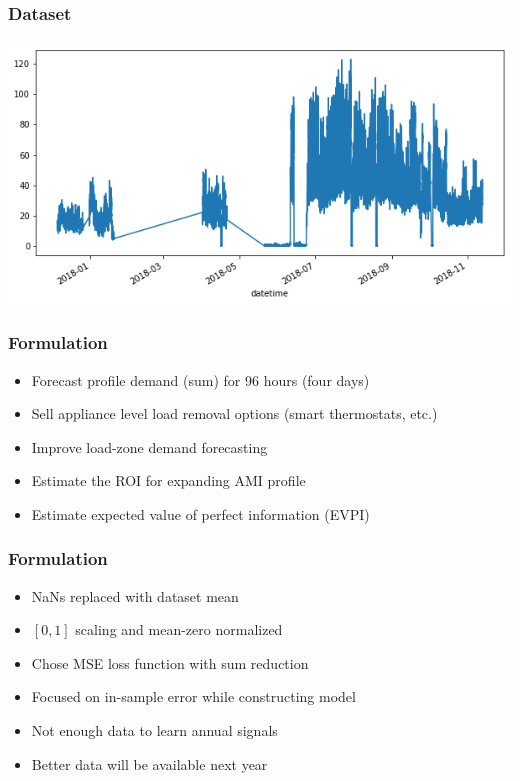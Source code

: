 \documentclass{beamer}
\begin{document}
\begin{frame}
  \frametitle{Dataset}
  \includegraphics[width=\textwidth]{datetimesum.png}
\end{frame}

\begin{frame}
  \frametitle{Formulation}
  \begin{itemize}
    \item Forecast profile demand (sum) for 96 hours (four days)
    \item Sell appliance level load removal options (smart thermostats, etc.)
    \item Improve load-zone demand forecasting
    \item Estimate the ROI for expanding AMI profile
    \item Estimate expected value of perfect information (EVPI)
  \end{itemize}
\end{frame}

\begin{frame}
  \frametitle{Formulation}
  \begin{itemize}
    \item NaNs replaced with dataset mean
    \item \([0,1]\) scaling and mean-zero normalized
    \item Chose MSE loss function with sum reduction
    \item Focused on in-sample error while constructing model
    \item Not enough data to learn annual signals
    \item Better data will be available next year
  \end{itemize}
\end{frame}
\end{document}
